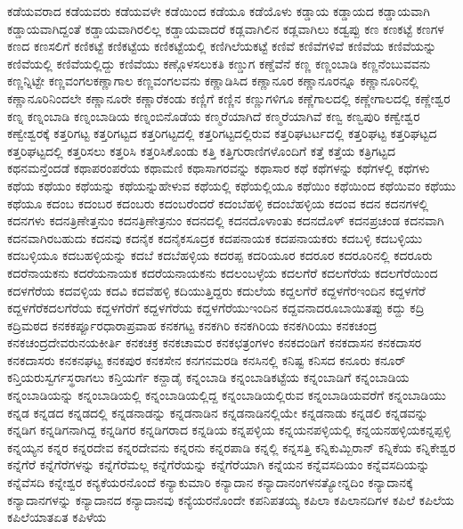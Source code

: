 {ಕಡೆಯವರಾದ
ಕಡೆಯವರು
ಕಡೆಯವಳೇ
ಕಡೆಯಿಂದ
ಕಡೆಯೂ
ಕಡೆಯೊಳು
ಕಡ್ಡಾಯ
ಕಡ್ಡಾಯದ
ಕಡ್ಡಾಯವಾಗಿ
ಕಡ್ಡಾಯವಾಗಿದ್ದಂತೆ
ಕಡ್ಡಾಯವಾಗಿರಲಿಲ್ಲ
ಕಡ್ಡಾಯವಾದರೆ
ಕಡ್ಲವಾಗಿಲಿನ
ಕಡ್ಲವಾಗಿಲು
ಕಡ್ವಪ್ಪು
ಕಣ
ಕಣಕಟ್ಟೆ
ಕಣಗಳ
ಕಣದ
ಕಣಸಲಿಗೆ
ಕಣಿಕಟ್ಟೆ
ಕಣಿಕಟ್ಟೆಯ
ಕಣಿಕಟ್ಟೆಯಲ್ಲಿ
ಕಣಿಗಿಲೆಯಕಟ್ಟೆ
ಕಣಿವೆ
ಕಣಿವೆಗಳಿವೆ
ಕಣಿವೆಯ
ಕಣಿವೆಯನ್ನು
ಕಣಿವೆಯಲ್ಲಿ
ಕಣಿವೆಯಲ್ಲಿದ್ದು
ಕಣಿವೆಯು
ಕಣ್ಗೊಳಸಲುಕತಿ
ಕಣ್ಡುಗ
ಕಣ್ಡೆವೆನೆ
ಕಣ್ಣ
ಕಣ್ಣಂಬಾಡಿ
ಕಣ್ಣನೆಂಬುವವನು
ಕಣ್ಣನ್ನಿಟ್ಟೇ
ಕಣ್ಣವಂಗಲಕಣ್ಣಾಗಾಲ
ಕಣ್ಣವಂಗಲವನು
ಕಣ್ಣಾಡಿಸಿದ
ಕಣ್ಣಾನೂರ
ಕಣ್ಣಾನೂರನ್ನೂ
ಕಣ್ಣಾನೂರಿನಲ್ಲಿ
ಕಣ್ಣಾನೂರಿನಿಂದಲೇ
ಕಣ್ಣಾನೂರೇ
ಕಣ್ಣಾರೆಕಂಡು
ಕಣ್ಣಿಗೆ
ಕಣ್ಣಿನ
ಕಣ್ಣುಗಳಿಗೂ
ಕಣ್ಣೆಗಾಲದಲ್ಲಿ
ಕಣ್ಣೇಗಾಲದಲ್ಲಿ
ಕಣ್ಣೇಶ್ವರ
ಕಣ್ನ
ಕಣ್ನಂಬಾಡಿ
ಕಣ್ನಂಬಾಡಿಯ
ಕಣ್ನಂಬಿನೊಡೆಯ
ಕಣ್ಮರೆಯಾಗಿದೆ
ಕಣ್ಮರೆಯಾಗಿವೆ
ಕಣ್ವ
ಕಣ್ವಪುರಿ
ಕಣ್ವೇಶ್ವರ
ಕಣ್ವೇಶ್ವರಕ್ಕೆ
ಕತ್ತರಿಗಟ್ಟ
ಕತ್ತರಿಗಟ್ಟದ
ಕತ್ತರಿಗಟ್ಟದಲ್ಲಿ
ಕತ್ತರಿಗಟ್ಟದಲ್ಲಿರುವ
ಕತ್ತರಿಘಟರ್ಟದಲ್ಲಿ
ಕತ್ತರಿಘಟ್ಟ
ಕತ್ತರಿಘಟ್ಟದ
ಕತ್ತರಿಘಟ್ಟದಲ್ಲಿ
ಕತ್ತರಿಸಲು
ಕತ್ತರಿಸಿ
ಕತ್ತರಿಸಿಕೊಂಡು
ಕತ್ತಿ
ಕತ್ತಿಗುರಾಣಿಗಳೊಂದಿಗೆ
ಕತ್ತೆ
ಕತ್ತೆಯ
ಕತ್ರಿಗಟ್ಟದ
ಕಥನಮನ್ತೆಂದಡೆ
ಕಥಾಪರಂಪರೆಯ
ಕಥಾಮಣಿ
ಕಥಾಸಾಗರವನ್ನು
ಕಥಾಸಾರ
ಕಥೆ
ಕಥೆಗಳನ್ನು
ಕಥೆಗಳಲ್ಲಿ
ಕಥೆಗಳು
ಕಥೆಯ
ಕಥೆಯಂ
ಕಥೆಯನ್ನು
ಕಥೆಯನ್ನುಹೇಳುವ
ಕಥೆಯಲ್ಲಿ
ಕಥೆಯಲ್ಲಿಯೂ
ಕಥೆಯಿಂ
ಕಥೆಯಿಂದ
ಕಥೆಯಿವಂ
ಕಥೆಯು
ಕಥೆಯೂ
ಕದಂಬ
ಕದಂಬರ
ಕದಂಬರು
ಕದಂಬರೆಂದರೆ
ಕದಂಬೆಹಳ್ಳಿ
ಕದಂಬೆಹಳ್ಳಿಯ
ಕದಂವ
ಕದನ
ಕದನಗಳಲ್ಲಿ
ಕದನಗಳು
ಕದನತ್ರಿಣೇತ್ತನುಂ
ಕದನತ್ರಿಣೇತ್ರನುಂ
ಕದನದಲ್ಲಿ
ಕದನದೊಳಾಂತು
ಕದನದೊಳ್
ಕದನಪ್ರಚಂಡ
ಕದನವಾಗಿ
ಕದನವಾಗಿರಬಹುದು
ಕದನವು
ಕದನೈಕ
ಕದನೈಕಸೂದ್ರಕ
ಕದಪನಾಯಕ
ಕದಪನಾಯಕರು
ಕದಬಳ್ಳಿ
ಕದಬಳ್ಳಿಯು
ಕದಬಳ್ಳಿಯೂ
ಕದಬಹಳ್ಳಿಯನ್ನು
ಕದಬೆ
ಕದಬೆಹಳ್ಳಿಯ
ಕದರಪ್ಪ
ಕದರಿಯೂರ
ಕದರೂರ
ಕದರೂರಿನಲ್ಲಿ
ಕದರೂರು
ಕದರೆನಾಯಕನು
ಕದರೆಯನಾಯಕ
ಕದರೆಯನಾಯಕನು
ಕದಲಂಬಳ್ಳೆಯ
ಕದಲಗೆರೆ
ಕದಲಗೆರೆಯ
ಕದಲಗೆರೆಯಿಂದ
ಕದಳಗೆರೆಯ
ಕದವಳ್ಳಿಯ
ಕದವಿ
ಕದವೆಹಳ್ಳಿ
ಕದಿಯುತ್ತಿದ್ದರು
ಕದುಲೆಯ
ಕದ್ದಲಗೆರೆ
ಕದ್ದಳಗೆರಇಂದಿನ
ಕದ್ದಳಗೆರೆ
ಕದ್ದಳಗೆರೆಕದಲಗೆರೆಯ
ಕದ್ದಳಗೆರೆಗೆ
ಕದ್ದಳಗೆರೆಯ
ಕದ್ದಳಗೆರೆಯುಇಂದಿನ
ಕದ್ದವನಾದರೂಬಾಯಿತಪ್ಪು
ಕದ್ದು
ಕದ್ರಿ
ಕದ್ರಿಮಠದ
ಕನಕಕರ್ಪ್ಪೂರಧಾರಾಪ್ರವಾಹ
ಕನಕಗಟ್ಟ
ಕನಕಗಿರಿ
ಕನಕಗಿರಿಯ
ಕನಕಗಿರಿಯು
ಕನಕಚಂದ್ರ
ಕನಕಚಂದ್ರದೇವರುನಯಕೀರ್ತಿ
ಕನಕಚಕ್ರ
ಕನಕಚಾಮರ
ಕನಕಛತ್ರಂಗಳಂ
ಕನಕದಂಡಿಗೆ
ಕನಕದಾಸನ
ಕನಕದಾಸರ
ಕನಕದಾಸರು
ಕನಕನಘಟ್ಟ
ಕನಕಪುರ
ಕನಕಸೇನ
ಕನಗನಮರಡಿ
ಕನಸಿನಲ್ಲಿ
ಕನಿಷ್ಟ
ಕನಿಸದ
ಕನೂರು
ಕನೂರ್
ಕನ್ತಿಯರುಸ್ವರ್ಗಸ್ಥರಾಗಲು
ಕನ್ತಿಯರ್ಗೆ
ಕನ್ದಾಡೈ
ಕನ್ನಂಬಾಡಿ
ಕನ್ನಂಬಾಡಿಕಟ್ಟೆಯ
ಕನ್ನಂಬಾಡಿಗೆ
ಕನ್ನಂಬಾಡಿಯ
ಕನ್ನಂಬಾಡಿಯನ್ನು
ಕನ್ನಂಬಾಡಿಯಲ್ಲಿ
ಕನ್ನಂಬಾಡಿಯಲ್ಲಿದ್ದ
ಕನ್ನಂಬಾಡಿಯಲ್ಲಿರುವ
ಕನ್ನಂಬಾಡಿಯವರೆಗೆ
ಕನ್ನಂಬಾಡಿಯು
ಕನ್ನಡ
ಕನ್ನಡದ
ಕನ್ನಡದಲ್ಲಿ
ಕನ್ನಡನಾಡನ್ನು
ಕನ್ನಡನಾಡಿನ
ಕನ್ನಡನಾಡಿನಲ್ಲಿಯೇ
ಕನ್ನಡನಾಡು
ಕನ್ನಡಲಿ
ಕನ್ನಡವನ್ನು
ಕನ್ನಡಿಗ
ಕನ್ನಡಿಗನಾಗಿದ್ದ
ಕನ್ನಡಿಗರ
ಕನ್ನಡಿಗರಾದ
ಕನ್ನಡಿಯ
ಕನ್ನಪಳ್ಳಿಯ
ಕನ್ನಯನಪಳ್ಳಿಯಲ್ಲಿ
ಕನ್ನಯನಹಳ್ಳಿಯಕನ್ನಪ್ಪಳ್ಳಿ
ಕನ್ನಯ್ಯನ
ಕನ್ನರ
ಕನ್ನರದೇವ
ಕನ್ನರದೇವನು
ಕನ್ನರನು
ಕನ್ನರಪಾಡಿ
ಕನ್ನಲ್ಲಿ
ಕನ್ನಸತ್ತಿ
ಕನ್ನಿಕುಮ್ಬಿರಾನ್
ಕನ್ನಿಕೆಯ
ಕನ್ನಿಕೇಶ್ವರ
ಕನ್ನೆಗೆರೆ
ಕನ್ನೆಗೆರೆಗಳನ್ನು
ಕನ್ನೆಗೆರೆಮಲ್ಲ
ಕನ್ನೆಗೆರೆಯನ್ನು
ಕನ್ನೆಗೆರೆಯಾಗಿ
ಕನ್ನೆಯನ
ಕನ್ನೆವಸದಿಯಂ
ಕನ್ನೆವಸದಿಯನ್ನು
ಕನ್ನೆವೆಸದಿ
ಕನ್ನೇಶ್ವರ
ಕನ್ಯಕೆಯರನೊಂದೆ
ಕನ್ಯಾಕುಮಾರಿ
ಕನ್ಯಾದಾನ
ಕನ್ಯಾದಾನಂಗಳನತ್ಯೋನ್ನದಿಂ
ಕನ್ಯಾದಾನಕ್ಕೆ
ಕನ್ಯಾದಾನಗಳನ್ನು
ಕನ್ಯಾದಾನದ
ಕನ್ಯಾದಾನವು
ಕನ್ಯೆಯರನೊಂದೇ
ಕಪನಿಪತಯ್ಯ
ಕಪಿಲಾ
ಕಪಿಲಾನದಿಗಳ
ಕಪಿಲೆ
ಕಪಿಲೆಯ
ಕಪಿಲೆಯಾತಏತ
ಕಪಿಳೆಯ
}
